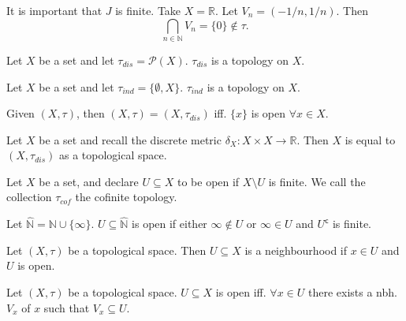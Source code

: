 \begin{example}
   It is important that \( J \) is finite. 
   Take \( X = \mathbb{R} \).
   Let \( V_n = (-1/n, 1/n) \). Then 
   \[
     \bigcap_{n \in \mathbb{N}} V_n = \{ 0 \} \notin \tau.
   \]
\end{example}

\begin{example}
  Let \( X \) be a set and let \( \tau_{dis} = \mathcal{P}(X)\).
  \( \tau_{dis} \) is a topology on \( X \).
\end{example}

\begin{example}
  Let \( X \) be a set and let \( \tau_{ind} = \{ \emptyset, X \}  \).
  \( \tau_{ind} \) is a topology on \( X \).
\end{example}

\begin{example}
  Given \( (X, \tau) \), then \( (X, \tau) = (X, \tau_{dis}) \)
  iff. \( \{ x\}  \) is open \( \forall x \in X \).
\end{example}

\begin{example}
    Let \( X \) be a set and recall the discrete metric \( \delta_X: X \times X \to \mathbb{R} \).
    Then \( X \) is equal to \( (X, \tau_{dis}) \) as a topological space.
\end{example}

\begin{example}
    Let \( X \) be a set, and declare \( U \subseteq X \) to be open
    if \( X \setminus U \) is finite.
    We call the collection \( \tau_{cof} \) the cofinite topology.
\end{example}

\begin{example}
  Let \( \hat{\mathbb{N}} = \mathbb{N} \cup \{ \infty \} \).
  \( U \subseteq \hat{\mathbb{N}} \) is open if either
  \( \infty \notin U \) or \( \infty \in U \) and \( U^\mathsf{c} \) is finite.
\end{example}

\begin{definition}[Neighbourhood]
   Let \( (X, \tau) \) be a topological space.
   Then \( U \subseteq X \) is a neighbourhood
   if \( x \in U \) and \( U \) is open.
\end{definition}

\begin{theorem}
   Let \( (X, \tau) \) be a topological space.
   \( U \subseteq X \) is open iff. \( \forall x \in U \)
   there exists a nbh.  \( V_x \)
   of \( x \) such that \( V_x \subseteq U \).
\end{theorem}


